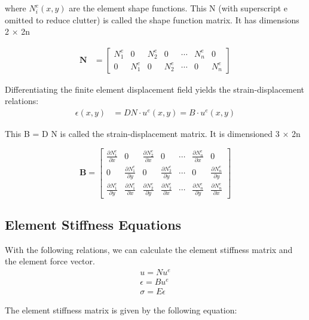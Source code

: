 \documentclass{article}  %
\begin{document}
where $N_i^e (x, y)$ are the element shape functions. This N (with superscript e omitted to reduce clutter) is called the shape function matrix. It has dimensions 2 × 2n

\begin{align}
  \mathbf{N} &=
  \begin{bmatrix}
      N_1^e & 0     & N_2^e & 0 & \cdots &N_n^e & 0     \\
      0     & N_1^e & 0 & N_2^e & \cdots &0     & N_n^e
  \end{bmatrix}
\end{align}

Differentiating the finite element displacement field yields the strain-displacement relations:
\begin{align}
  \epsilon(x,y) &= D N \cdot u^e(x,y) = B \cdot u^e(x,y) 
\end{align}

This B = D N is called the strain-displacement matrix. It is dimensioned 3 × 2n

\begin{equation}
  \mathbf{B} =
  \begin{bmatrix}
      \frac{\partial N_1^e}{\partial x} & 0     & \frac{\partial N_2^e}{\partial x} & 0 & \cdots &\frac{\partial N_n^e}{\partial x} & 0     \\
      0     & \frac{\partial N_1^e}{\partial y} & 0 & \frac{\partial N_2^e}{\partial y} & \cdots &0     & \frac{\partial N_n^e}{\partial y} \\
      \frac{\partial N_1^e}{\partial y} & \frac{\partial N_1^e}{\partial x} & \frac{\partial N_2^e}{\partial y} & \frac{\partial N_2^e}{\partial x} & \cdots &\frac{\partial N_n^e}{\partial y} & \frac{\partial N_n^e}{\partial x}
  \end{bmatrix}
\end{equation}

\subsection{Element Stiffness Equations}
With the following relations, we can calculate the element stiffness matrix and the element force vector.
\begin{align}
  u = N u^e\\
  \epsilon = B u^e\\
  \sigma = E \epsilon
\end{align}

The element stiffness matrix is given by the following equation:
\end{document}
